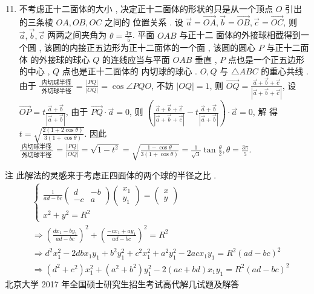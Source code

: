 \documentclass[10pt]{article}
\begin{document}
\begin{enumerate}
  \setcounter{enumi}{10}
  \item  不考虑正十二面体的大小 ,  决定正十二面体的形状的只是从一个顶点  $O$  引出的三条棱  $O A, O B, O C$  之间的   位置关系 .  设  $\vec{a}=\overrightarrow{O A}, \vec{b}=\overrightarrow{O B}, \vec{c}=\overrightarrow{O C}$,  则  $\vec{a}, \vec{b}, \vec{c}$  两两之间夹角为  $\theta=\frac{3 \pi}{5}$.  平面  $O A B$  与正十二   面体的外接球相截得到一个圆 ,  该圆的内接正五边形为正十二面体的一个面 ,  该圆的圆心  $P$  与正十二面体   的外接球的球心  $Q$  的连线应当与平面  $O A B$  垂直 , $P$  点也是一个正五边形的中心 , $Q$  点也是正十二面体的   内切球的球心 . $O, Q$  与  $\triangle A B C$  的重心共线 .  由于  $\frac{\text { 内切球半径 }}{\text { 外切球半径 }}=\frac{|P Q|}{|O Q|}=\cos \angle P Q O$,  不妨  $|O Q|=1$,  则  $\overrightarrow{O Q}=\frac{\vec{a}+\vec{b}+\vec{c}}{|\vec{a}+\vec{b}+\vec{c}|}$,  设  $\overrightarrow{O P}=t \frac{\vec{a}+\vec{b}}{|\vec{a}+\vec{b}|}$,  由于  $\overrightarrow{P Q} \cdot \vec{a}=0$,  则  $\left(\frac{\vec{a}+\vec{b}+\vec{c}}{|\vec{a}+\vec{b}+\vec{c}|}-t \frac{\vec{a}+\vec{b}}{|\vec{a}+\vec{b}|}\right) \cdot \vec{a}=0$,  解   得  $t=\sqrt{\frac{2(1+2 \cos \theta)}{3(1+\cos \theta)}}$.  因此  $\frac{\text { 内切球半径 }}{\text { 外切球半径 }}=\frac{|P Q|}{|O Q|}=\sqrt{1-t^{2}}=\sqrt{\frac{1-\cos \theta}{3(1+\cos \theta)}}=\frac{1}{\sqrt{3}} \tan \frac{\theta}{2}, \theta=\frac{3 \pi}{5}$.
\end{enumerate}
 注   此解法的灵感来于考虑正四面体的两个球的半径之比 .
$$
\begin{aligned}
& \left\{\begin{array}{l}\frac{1}{a d-b c}\left(\begin{array}{cc}d & -b \\-c & a\end{array}\right)\left(\begin{array}{l}x_{1} \\y_{1}\end{array}\right)=\left(\begin{array}{l}x \\y\end{array}\right) \\x^{2}+y^{2}=R^{2}\end{array}\right. \\
& \Longrightarrow\left(\frac{d x_{1}-b y_{1}}{a d-b c}\right)^{2}+\left(\frac{-c x_{1}+a y_{1}}{a d-b c}\right)^{2}=R^{2} \\
& \Longrightarrow d^{2} x_{1}^{2}-2 d b x_{1} y_{1}+b^{2} y_{1}^{2}+c^{2} x_{1}^{2}+a^{2} y_{1}^{2}-2 a c x_{1} y_{1}=R^{2}(a d-b c)^{2} \\
& \Longrightarrow\left(d^{2}+c^{2}\right) x_{1}^{2}+\left(a^{2}+b^{2}\right) y_{1}^{2}-2(a c+b d) x_{1} y_{1}=R^{2}(a d-b c)^{2} 
\end{aligned}
$$
 北京大学  2017  年全国硕士研究生招生考试高代解几试题及解答 
\end{document}
